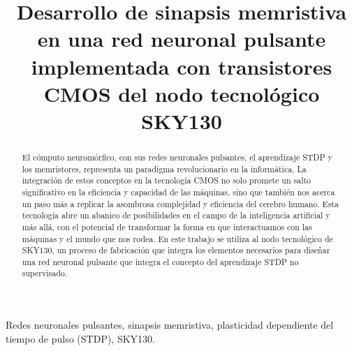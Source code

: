 \documentclass[conference]{IEEEtran}
\begin{document}
\title{Desarrollo de sinapsis memristiva en una red neuronal pulsante implementada con transistores CMOS del nodo tecnológico SKY130\\
}

\author{
\and
{}
}

\maketitle

\begin{abstract}
El cómputo neuromórfico, con sus redes neuronales pulsantes, el aprendizaje STDP y los memristores, representa un paradigma revolucionario en la informática. La integración de estos conceptos en la tecnología CMOS no solo promete un salto significativo en la eficiencia y capacidad de las máquinas, sino que también nos acerca un paso más a replicar la asombrosa complejidad y eficiencia del cerebro humano. Esta tecnología abre un abanico de posibilidades en el campo de la inteligencia artificial y más allá, con el potencial de transformar la forma en que interactuamos con las máquinas y el mundo que nos rodea. En este trabajo se utiliza al nodo tecnológico de SKY130, un proceso de fabricación que integra los elementos necesarios para diseñar una red neuronal pulsante que integra el concepto del aprendizaje STDP no supervisado.
\end{abstract}

\begin{IEEEkeywords}
Redes neuronales pulsantes, sinapsis memristiva, plasticidad dependiente del tiempo de pulso (STDP), SKY130.
\end{IEEEkeywords}
\end{document}
